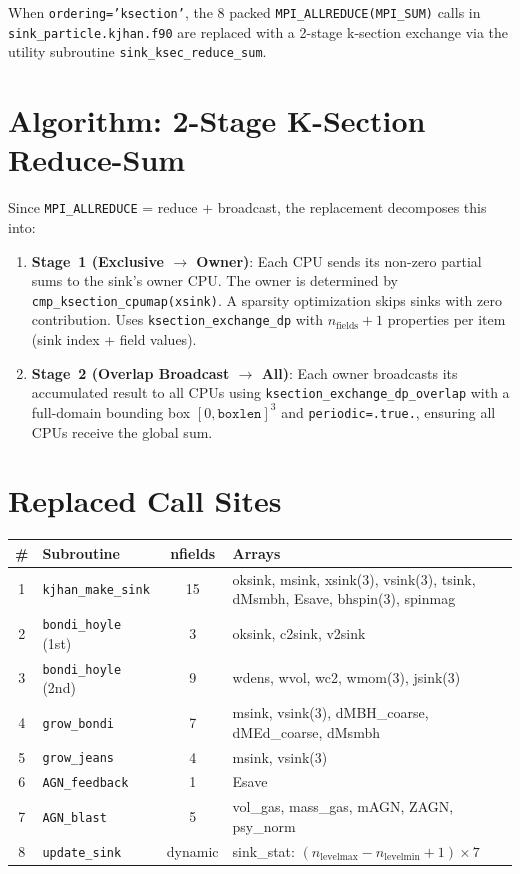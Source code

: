 \documentclass[11pt,fleqn]{book}
\begin{document}
When \texttt{ordering='ksection'}, the 8 packed \texttt{MPI\_ALLREDUCE(MPI\_SUM)} calls in \texttt{sink\_particle.kjhan.f90} are replaced with a 2-stage k-section exchange via the utility subroutine \texttt{sink\_ksec\_reduce\_sum}.

\section{Algorithm: 2-Stage K-Section Reduce-Sum}

Since \texttt{MPI\_ALLREDUCE} = reduce + broadcast, the replacement decomposes this into:

\begin{enumerate}[leftmargin=2em]
  \item \textbf{Stage~1 (Exclusive $\to$ Owner)}: Each CPU sends its non-zero partial sums to the sink's owner CPU. The owner is determined by \texttt{cmp\_ksection\_cpumap(xsink)}. A sparsity optimization skips sinks with zero contribution. Uses \texttt{ksection\_exchange\_dp} with $n_\mathrm{fields}+1$ properties per item (sink index + field values).
  \item \textbf{Stage~2 (Overlap Broadcast $\to$ All)}: Each owner broadcasts its accumulated result to all CPUs using \texttt{ksection\_exchange\_dp\_overlap} with a full-domain bounding box $[0, \texttt{boxlen}]^3$ and \texttt{periodic=.true.}, ensuring all CPUs receive the global sum.
\end{enumerate}

\section{Replaced Call Sites}

\begin{center}
\begin{tabular}{clcl}
\toprule
\textbf{\#} & \textbf{Subroutine} & \textbf{nfields} & \textbf{Arrays} \\
\midrule
1 & \texttt{kjhan\_make\_sink} & 15 & oksink, msink, xsink(3), vsink(3), tsink, dMsmbh, Esave, bhspin(3), spinmag \\
2 & \texttt{bondi\_hoyle} (1st) & 3 & oksink, c2sink, v2sink \\
3 & \texttt{bondi\_hoyle} (2nd) & 9 & wdens, wvol, wc2, wmom(3), jsink(3) \\
4 & \texttt{grow\_bondi} & 7 & msink, vsink(3), dMBH\_coarse, dMEd\_coarse, dMsmbh \\
5 & \texttt{grow\_jeans} & 4 & msink, vsink(3) \\
6 & \texttt{AGN\_feedback} & 1 & Esave \\
7 & \texttt{AGN\_blast} & 5 & vol\_gas, mass\_gas, mAGN, ZAGN, psy\_norm \\
8 & \texttt{update\_sink} & dynamic & sink\_stat: $(n_\mathrm{levelmax} - n_\mathrm{levelmin} + 1) \times 7$ \\
\bottomrule
\end{tabular}
\end{center}
\end{document}
